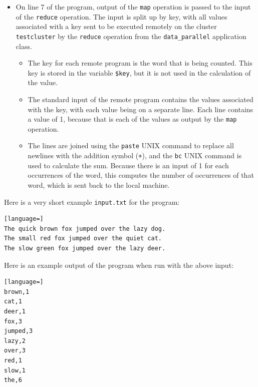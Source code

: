 \documentclass[twoside]{report}
\begin{document}
\begin{itemize}
  \item
        On line 7 of the program, output of the \texttt{map} operation is passed to the input of the \texttt{reduce} operation. The input is split up by key, with all values associated with a key sent to be executed remotely on the cluster \texttt{testcluster} by the \texttt{reduce} operation from the \texttt{data\_parallel} application class.
        \begin{itemize}
          \item The key for each remote program is the word that is being counted. This key is stored in the variable \texttt{\$key}, but it is not used in the calculation of the value.
          \item The standard input of the remote program contains the values associated with the key, with each value being on a separate line. Each line contains a value of 1, because that is each of the values as output by the \texttt{map} operation.
          \item The lines are joined using the \texttt{paste} UNIX command to replace all newlines with the addition symbol (\texttt{+}), and the \texttt{bc} UNIX command is used to calculate the sum.
                Because there is an input of 1 for each occurrences of the word, this computes the number of occurrences of that word, which is sent back to the local machine.
        \end{itemize}
\end{itemize}

Here is a very short example \texttt{input.txt} for the program:

\begin{minipage}[c]{\textwidth-15pt}
  \begin{lstlisting}[language=]
The quick brown fox jumped over the lazy dog.
The small red fox jumped over the quiet cat.
The slow green fox jumped over the lazy deer.
\end{lstlisting}
  \smallskip
\end{minipage}

Here is an example output of the program when run with the above input:

\begin{minipage}[c]{\textwidth-15pt}
  \begin{lstlisting}[language=]
brown,1
cat,1
deer,1
fox,3
jumped,3
lazy,2
over,3
red,1
slow,1
the,6
\end{lstlisting}
  \smallskip
\end{minipage}
\end{document}

